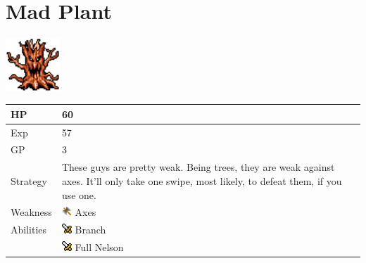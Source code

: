 \section{Mad Plant}
\label{monster:mad_plant}

\includegraphics[height=2cm,keepaspectratio]{./resources/monster/mad_plant}

\begin{longtable}{ l p{9cm} }
	HP
	& 60
\\ \hline
	Exp
	& 57
\\ \hline
	GP
	& 3
\\ \hline
	Strategy
	& These guys are pretty weak. Being trees, they are weak against axes. It'll only take one swipe, most likely, to defeat them, if you use one.
\\ \hline
	Weakness
	& \includegraphics[height=1em,keepaspectratio]{./resources/effects/axe} Axes
\\ \hline
	Abilities
	& \includegraphics[height=1em,keepaspectratio]{./resources/effects/damage} Branch \\
	& \includegraphics[height=1em,keepaspectratio]{./resources/effects/damage} Full Nelson
\end{longtable}
